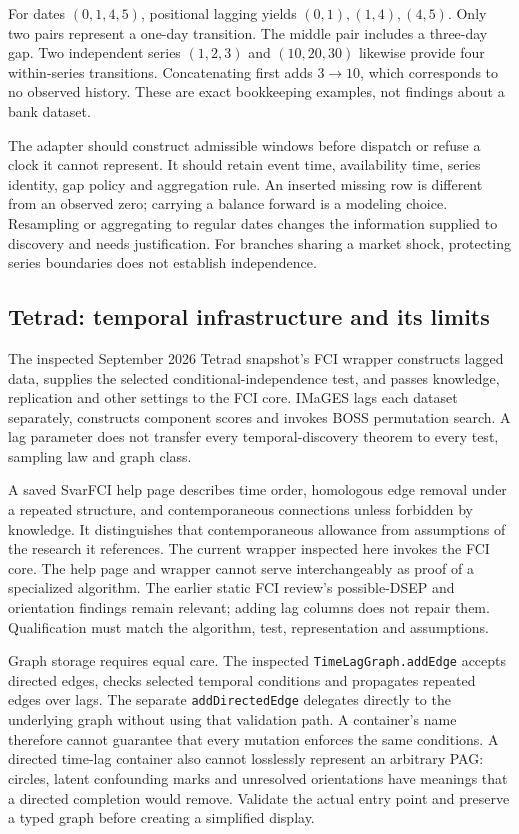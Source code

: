 For dates $(0,1,4,5)$, positional lagging yields $(0,1),(1,4),(4,5)$. Only two
pairs represent a one-day transition. The middle pair includes a three-day
gap. Two independent series $(1,2,3)$ and $(10,20,30)$ likewise provide four
within-series transitions. Concatenating first adds $3\rightarrow10$, which
corresponds to no observed history. These are exact bookkeeping examples,
not findings about a bank dataset.~\citep{exec15_javatemporal_exact}

The adapter should construct admissible windows before dispatch or refuse a
clock it cannot represent. It should retain event time, availability time,
series identity, gap policy and aggregation rule. An inserted missing row is
different from an observed zero; carrying a balance forward is a modeling
choice. Resampling or aggregating to regular dates changes the information
supplied to discovery and needs justification. For branches sharing a market
shock, protecting series boundaries does not establish independence.
\citep{exec15_javatemporal_design}

\subsection{Tetrad: temporal infrastructure and its limits}

The inspected September 2026 Tetrad snapshot's FCI wrapper constructs lagged
data, supplies the selected conditional-independence test, and passes knowledge,
replication and other settings to the FCI core. IMaGES lags each dataset
separately, constructs component scores and invokes BOSS permutation search.
A lag parameter does not transfer every temporal-discovery theorem to every
test, sampling law and graph class.~\citep{exec15_javatemporal_tetrad}

A saved SvarFCI help page describes time order, homologous edge removal under
a repeated structure, and contemporaneous connections unless forbidden by
knowledge. It distinguishes that contemporaneous allowance from assumptions
of the research it references. The current wrapper inspected here invokes
the FCI core. The help page and wrapper cannot serve interchangeably as proof
of a specialized algorithm. The earlier static FCI review's possible-DSEP and
orientation findings remain relevant; adding lag columns does not repair
them. Qualification must match the algorithm, test, representation and
assumptions.~\citep{exec15_javatemporal_tetrad,exec14_java_latent_sources}

Graph storage requires equal care. The inspected
\texttt{TimeLagGraph.addEdge} accepts directed edges, checks selected temporal
conditions and propagates repeated edges over lags. The separate
\texttt{addDirectedEdge} delegates directly to the underlying graph without
using that validation path. A container's name therefore cannot guarantee
that every mutation enforces the same conditions. A directed time-lag
container also cannot losslessly represent an arbitrary PAG: circles, latent
confounding marks and unresolved orientations have meanings that a directed
completion would remove. Validate the actual entry point and preserve a typed
graph before creating a simplified display.
\citep{exec15_javatemporal_tetrad,exec15_javatemporal_design}

